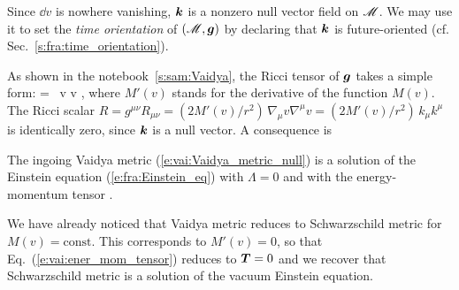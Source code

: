 \begin{prop}
Since $\dd v$ is nowhere vanishing, $\bm{k}$ is a nonzero null vector field on $\mathscr{M}$.
We may use it to set the \emph{time orientation} of $(\mathscr{M},\bm{g})$
by declaring that $\bm{k}$ is future-oriented (cf. Sec.~\ref{s:fra:time_orientation}).
\end{prop}

As shown in the notebook~\ref{s:sam:Vaidya},
the Ricci tensor of $\bm{g}$ takes a simple form:
\be \label{e:vai:Ricci_tensor}
     = \, \dd v \otimes \dd v ,
\ee
where $M'(v)$ stands for the derivative of the function $M(v)$.
The Ricci scalar $R = g^{\mu\nu} R_{\mu\nu} = (2M'(v)/r^2) \, \nabla_\mu v \nabla^\mu v =  (2M'(v)/r^2) \, k_\mu k^\mu$ is identically zero, since $\bm{k}$ is a null vector.
A consequence is
\begin{prop}
The ingoing Vaidya metric (\ref{e:vai:Vaidya_metric_null}) is a solution
of the Einstein equation (\ref{e:fra:Einstein_eq})
with $\Lambda = 0$ and with the energy-momentum tensor
\be \label{e:vai:ener_mom_tensor}
    .
\ee
\end{prop}

\begin{remark}
We have already noticed that Vaidya metric reduces to Schwarzschild metric for $M(v) = \mathrm{const}$.
This corresponds to $M'(v) = 0$, so that
Eq.~(\ref{e:vai:ener_mom_tensor}) reduces to $\bm{T} = 0$ and we recover that
Schwarzschild metric is a solution of the vacuum Einstein equation.
\end{remark}

